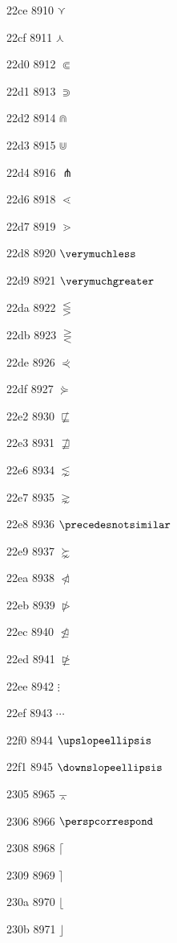 \documentclass[11pt]{article}
\begin{document}
22ce 8910 \ensuremath{\curlyvee}

22cf 8911 \ensuremath{\curlywedge}

22d0 8912 \ensuremath{\Subset}

22d1 8913 \ensuremath{\Supset}

22d2 8914 \ensuremath{\Cap}

22d3 8915 \ensuremath{\Cup}

22d4 8916 \ensuremath{\pitchfork}

22d6 8918 \ensuremath{\lessdot}

22d7 8919 \ensuremath{\gtrdot}

22d8 8920 \ensuremath{\verymuchless}

22d9 8921 \ensuremath{\verymuchgreater}

22da 8922 \ensuremath{\lesseqgtr}

22db 8923 \ensuremath{\gtreqless}

22de 8926 \ensuremath{\curlyeqprec}

22df 8927 \ensuremath{\curlyeqsucc}

22e2 8930 \ensuremath{\not\sqsubseteq}

22e3 8931 \ensuremath{\not\sqsupseteq}

22e6 8934 \ensuremath{\lnsim}

22e7 8935 \ensuremath{\gnsim}

22e8 8936 \ensuremath{\precedesnotsimilar}

22e9 8937 \ensuremath{\succnsim}

22ea 8938 \ensuremath{\ntriangleleft}

22eb 8939 \ensuremath{\ntriangleright}

22ec 8940 \ensuremath{\ntrianglelefteq}

22ed 8941 \ensuremath{\ntrianglerighteq}

22ee 8942 \ensuremath{\vdots}

22ef 8943 \ensuremath{\cdots}

22f0 8944 \ensuremath{\upslopeellipsis}

22f1 8945 \ensuremath{\downslopeellipsis}

2305 8965 \ensuremath{\barwedge}

2306 8966 \ensuremath{\perspcorrespond}

2308 8968 \ensuremath{\lceil}

2309 8969 \ensuremath{\rceil}

230a 8970 \ensuremath{\lfloor}

230b 8971 \ensuremath{\rfloor}
\end{document}

